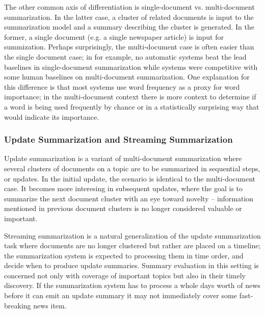 The other common axis of differentiation is single-document vs. 
multi-document summarization. In the latter case, a cluster of related 
documents is input to the summarization model and a summary describing the 
cluster is generated. In the former, a single document (e.g. a single
newspaper article) is input for summization. Perhaps surprisingly, 
the multi-document case is often easier than the single document case;
in \cite{nenkovaSomething} for example, no automatic systems beat the lead
baselines in single-document summarization while systems were competitive 
with some human baselines on multi-document summarization.
One explanation for this difference is that most systems use word frequency
as a proxy for word importance; in the multi-document context there is more 
context to determine if a word is being used frequently by chance or 
in a statistically surprising way that would indicate its importance.

\subsubsection{Update Summarization and Streaming Summarization}

Update summarization is a variant of multi-document summarization where
several clusters of documents on a topic are to be summarized in sequential
steps, or updates. In the initial update, the scenario is identical to the 
multi-document case. It becomes more interesing in subsequent updates,
where the goal is to summarize the next document cluster with an eye toward
novelty -- information mentioned in previous document clusters is no longer 
considered valuable or important. 

Streaming summarization is a natural generalization of the update summarization
task where documents are no longer clustered but rather are placed on a 
timeline; the summarization system is expected to processing them in 
time order, and decide when to produce update summaries. 
Summary evaluation in this setting is concerned not only with coverage of
important topics but also in their timely discovery. If the summarization
system has to process a whole days worth of news before it can emit 
an update summary it may not immediately cover some fast-breaking news item.












